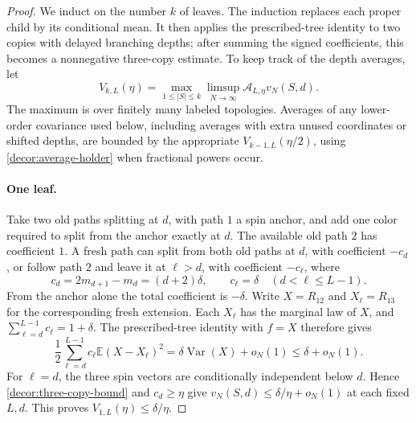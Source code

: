 \begin{proof}
We induct on the number $k$ of leaves. The induction replaces each
proper child by its conditional mean. It then applies the prescribed-tree
identity to two copies with delayed branching depths; after summing the
signed coefficients, this becomes a nonnegative three-copy estimate.
To keep track of the depth averages, let
\begin{equation}
 V_{k,L}(\eta)=\max_{1\le |S|\le k}
       \limsup_{N\to\infty}\mathcal A_{L,\eta}v_N(S,d).
 \label{decor:V-definition}
\end{equation}
The maximum is over finitely many labeled topologies.  Averages of
any lower-order covariance used below, including averages with extra
unused coordinates or shifted depths, are bounded by the appropriate
$V_{k-1,L}(\eta/2)$, using
\eqref{decor:average-holder} when fractional powers occur.

\paragraph{One leaf.}
Take two old paths splitting at $d$, with path $1$ a spin anchor, and
add one color required to split from the anchor exactly at $d$.
The available old path $2$ has coefficient $1$.  A fresh path can
split from both old paths at $d$, with coefficient $-c_d$, or follow
path $2$ and leave it at $\ell>d$, with coefficient $-c_\ell$, where
\begin{equation}
 c_d=2m_{d+1}-m_d=(d+2)\delta,
 \qquad c_\ell=\delta\quad(d<\ell\le L-1).
 \label{decor:c-weights}
\end{equation}
From the anchor alone the total coefficient is $-\delta$.
Write $X=R_{12}$ and $X_\ell=R_{13}$ for the corresponding fresh
extension.  Each $X_\ell$ has the marginal law of $X$, and
$\sum_{\ell=d}^{L-1}c_\ell=1+\delta$.  The prescribed-tree identity
with $f=X$ therefore gives
\begin{equation}
 \frac12\sum_{\ell=d}^{L-1}c_\ell
      \mathbb E(X-X_\ell)^2
       =\delta\operatorname{Var}(X)+o_N(1)
       \le\delta+o_N(1).
 \label{decor:singleton-identity}
\end{equation}
For $\ell=d$, the three spin vectors are conditionally independent
below $d$.  Hence \eqref{decor:three-copy-bound} and $c_d\ge\eta$
give $v_N(S,d)\le\delta/\eta+o_N(1)$ at each fixed $L,d$.
This proves $V_{1,L}(\eta)\le\delta/\eta$.


\end{proof}
